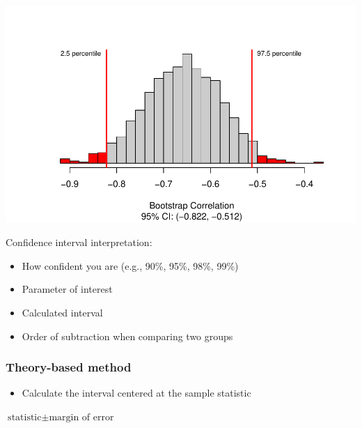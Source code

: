 \documentclass[
]{report}
\newenvironment{Shaded}{\begin{snugshade}}{\end{snugshade}}
\newcommand{\AttributeTok}[1]{\textcolor[rgb]{0.13,0.29,0.53}{#1}}
\newcommand{\CommentTok}[1]{\textcolor[rgb]{0.56,0.35,0.01}{\textit{#1}}}
\newcommand{\DecValTok}[1]{\textcolor[rgb]{0.00,0.00,0.81}{#1}}
\newcommand{\FunctionTok}[1]{\textcolor[rgb]{0.13,0.29,0.53}{\textbf{#1}}}
\newcommand{\NormalTok}[1]{#1}
\newcommand{\OtherTok}[1]{\textcolor[rgb]{0.56,0.35,0.01}{#1}}
\newcommand{\SpecialCharTok}[1]{\textcolor[rgb]{0.81,0.36,0.00}{\textbf{#1}}}
\providecommand{\tightlist}{%
  \setlength{\itemsep}{0pt}\setlength{\parskip}{0pt}}
\newcommand{\rgi}{\hspace{24pt}}  %
\begin{document}
\begin{center}\includegraphics[width=0.7\linewidth]{13-LN013-regression_files/figure-latex/unnamed-chunk-16-1} \end{center}

Confidence interval interpretation:

\begin{itemize}
\item
  How confident you are (e.g., 90\%, 95\%, 98\%, 99\%)
\item
  Parameter of interest
\item
  Calculated interval
\item
  Order of subtraction when comparing two groups
\end{itemize}

\vspace{0.8in}

\newpage

\hypertarget{theory-based-method-6}{%
\subsubsection*{Theory-based method}\label{theory-based-method-6}}

\begin{itemize}
\tightlist
\item
  Calculate the interval centered at the sample statistic
\end{itemize}

\rgi \(\text{statistic} \pm \text{margin of error}\)

\vspace{0.6in}

\begin{Shaded}
\end{Shaded}
\end{document}
